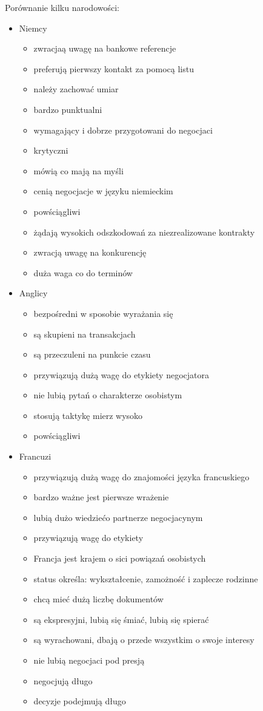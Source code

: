 \documentclass[a4paper,10pt]{report}
\begin{document}
\noindent Porównanie kilku narodowości:
\begin{itemize}
	\item Niemcy
	\begin{itemize}
		\item zwracjaą uwagę na bankowe referencje
		\item preferują pierwszy kontakt za pomocą listu
		\item należy zachować umiar
		\item bardzo punktualni
		\item wymagający i dobrze przygotowani do negocjaci
		\item krytyczni
		\item mówią co mają na myśli
		\item cenią negocjacje w języku niemieckim
		\item powściągliwi
		\item żądają wysokich odszkodowań za niezrealizowane kontrakty
		\item zwracją uwagę na konkurencję
		\item duża waga co do terminów
	\end{itemize}
	\item Anglicy
	\begin{itemize}
		\item bezpośredni w sposobie wyrażania się
		\item są skupieni na transakcjach
		\item są przeczuleni na punkcie czasu
		\item przywiązują dużą wagę do etykiety negocjatora
		\item nie lubią pytań o charakterze osobistym
		\item stosują taktykę mierz wysoko
		\item powściągliwi
	\end{itemize}
	\item Francuzi
	\begin{itemize}
		\item przywiązują dużą wagę do znajomości języka francuskiego
		\item bardzo ważne jest pierwsze wrażenie
		\item lubią dużo wiedziećo partnerze negocjacynym
		\item przywiązują wagę do etykiety
		\item Francja jest krajem o sici powiązań osobistych
		\item status określa: wykształcenie, zamożność i zaplecze rodzinne
		\item chcą mieć dużą liczbę dokumentów
		\item są ekspresyjni, lubią się śmiać, lubią się spierać
		\item są wyrachowani, dbają o przede wszystkim o swoje interesy
		\item nie lubią negocjaci pod presją
		\item negocjują długo
		\item decyzje podejmują długo
	\end{itemize}
\end{itemize}
\end{document}
